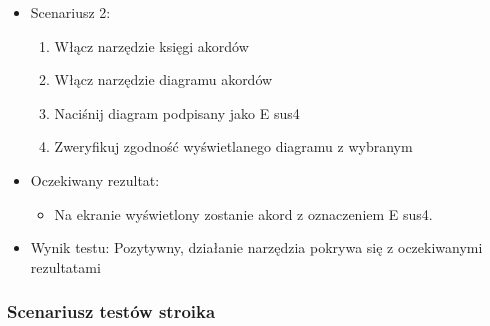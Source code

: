 \begin{itemize}
    \item Scenariusz 2:
        \begin{enumerate}
            \item Włącz narzędzie księgi akordów
            \item Włącz narzędzie diagramu akordów
            \item Naciśnij diagram podpisany jako E sus4
            \item Zweryfikuj zgodność wyświetlanego diagramu z wybranym
        \end{enumerate}
    \item Oczekiwany rezultat:
        \begin{itemize}
            \item Na ekranie wyświetlony zostanie akord z oznaczeniem E sus4.
        \end{itemize}
    \item Wynik testu: Pozytywny, działanie narzędzia pokrywa się z oczekiwanymi rezultatami
\end{itemize}

\subsubsection{Scenariusz testów stroika}

